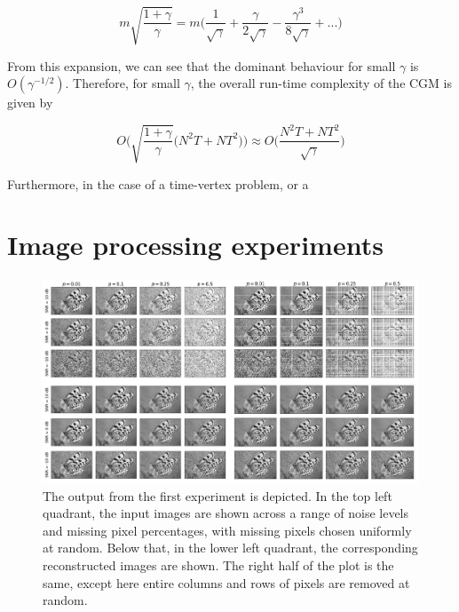 $$
    m \sqrt{\frac{1 + \gamma}{\gamma}} = m \Big( \frac{1}{\sqrt{\gamma}} + \frac{\gamma}{2\sqrt{\gamma}}  - \frac{\gamma^3}{8\sqrt{\gamma}} + ... \Big)
$$

From this expansion, we can see that the dominant behaviour for small $\gamma$ is $O(\gamma^{-1/2})$. Therefore, for small $\gamma$, the overall run-time complexity of the CGM is given by

\begin{equation}
    \label{eq:OCGM}
    O\Bigg(\sqrt{\frac{1 + \gamma}{\gamma}}\big(N^2T + NT^2\big) \Bigg) \approx O\Bigg(\frac{N^2T + NT^2}{\sqrt{\gamma}} \Bigg)
\end{equation}

Furthermore, in the case of a time-vertex problem, or a

\section{Image processing experiments}

\label{sec:im_proc_exp}

\begin{figure}[t]
    \hypertarget{butterflies}{}
    \label{fig:butterflies}
    \begin{center}
        \includegraphics[width=0.95\linewidth]{Figures/butterflies.jpg}
    \end{center}
    \caption{\small{The output from the first experiment is depicted. In the top left quadrant, the input images are shown across a range of noise levels and missing pixel percentages, with missing pixels chosen uniformly at random. Below that, in the lower left quadrant, the corresponding reconstructed images are shown. The right half of the plot is the same, except here entire columns and rows of pixels are removed at random.}}
\end{figure}

